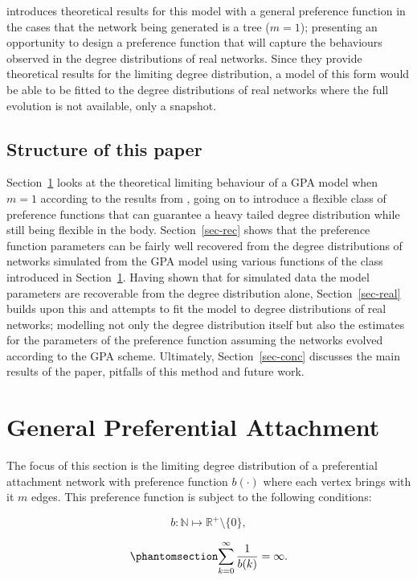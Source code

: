 \documentclass[
  sn-basic,
]{sn-jnl}
\theoremstyle{plain}
\theoremstyle{remark}
\begin{document}
\citep{rudas07} introduces theoretical results for this model with a
general preference function in the cases that the network being
generated is a tree (\(m=1\)); presenting an opportunity to design a
preference function that will capture the behaviours observed in the
degree distributions of real networks. Since they provide theoretical
results for the limiting degree distribution, a model of this form would
be able to be fitted to the degree distributions of real networks where
the full evolution is not available, only a snapshot.

\subsection{Structure of this paper}\label{structure-of-this-paper}

Section~\ref{sec-gpa} looks at the theoretical limiting behaviour of a
GPA model when \(m=1\) according to the results from \citep{rudas07},
going on to introduce a flexible class of preference functions that can
guarantee a heavy tailed degree distribution while still being flexible
in the body. Section~\ref{sec-rec} shows that the preference function
parameters can be fairly well recovered from the degree distributions of
networks simulated from the GPA model using various functions of the
class introduced in Section~\ref{sec-gpa}. Having shown that for
simulated data the model parameters are recoverable from the degree
distribution alone, Section~\ref{sec-real} builds upon this and attempts
to fit the model to degree distributions of real networks; modelling not
only the degree distribution itself but also the estimates for the
parameters of the preference function assuming the networks evolved
according to the GPA scheme. Ultimately, Section~\ref{sec-conc}
discusses the main results of the paper, pitfalls of this method and
future work.

\section{General Preferential Attachment}\label{sec-gpa}

The focus of this section is the limiting degree distribution of a
preferential attachment network with preference function \(b(\cdot)\)
where each vertex brings with it \(m\) edges. This preference function
is subject to the following conditions:

\[
b:\mathbb N \mapsto \mathbb R^+\setminus\{0\},
\]

\begin{equation}\phantomsection\label{eq-condb2}{
\sum_{k=0}^\infty\frac{1}{b(k)} = \infty.
}\end{equation}
\end{document}
